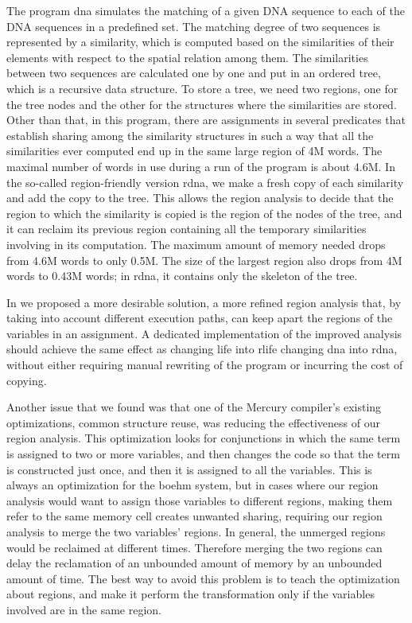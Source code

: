 \documentclass{tlp}
\newcommand{\bench}[1]{{#1}}
\begin{document}
The program \bench{dna} simulates the matching of a given DNA sequence
to each of the DNA sequences in a predefined set.
The matching degree of two sequences is represented by a similarity,
which is computed based on the similarities of their elements
with respect to the spatial relation among them.
The similarities between two sequences are calculated one by one
and put in an ordered tree, which is a recursive data structure.
To store a tree, we need two regions, one for the tree nodes
and the other for the structures where the similarities are stored.
Other than that, in this program,
there are assignments in several predicates
that establish sharing among the similarity structures in such a way that
all the similarities ever computed end up in the same large region of 4M words.
The maximal number of words in use during a run of the program is about 4.6M.
In the so-called region-friendly version \bench{rdna},
we make a fresh copy of each similarity and add the copy to the tree.
This allows the region analysis to decide
that the region to which the similarity is copied
is the region of the nodes of the tree,
and it can reclaim its previous region containing
all the temporary similarities involving in its computation.
The maximum amount of memory needed drops from 4.6M words to only 0.5M.
The size of the largest region also drops from 4M words to 0.43M words;
in \bench{rdna}, it contains only the skeleton of the tree.

In \cite{Phan09ppdp} we proposed a more desirable solution,
a more refined region analysis that,
by taking into account different execution paths,
can keep apart the regions of the variables in an assignment.
A dedicated implementation of the improved analysis
should achieve the same effect as
changing \bench{life} into \bench{rlife}
changing \bench{dna} into \bench{rdna},
without either requiring manual rewriting of the program
or incurring the cost of copying.

Another issue that we found was that
one of the Mercury compiler's existing optimizations, common structure reuse,
was reducing the effectiveness of our region analysis.
This optimization looks for conjunctions
in which the same term is assigned to two or more variables,
and then changes the code so that the term is constructed just once,
and then it is assigned to all the variables.
This is always an optimization for the boehm system,
but in cases where our region analysis
would want to assign those variables to different regions,
making them refer to the same memory cell creates unwanted sharing,
requiring our region analysis to merge the two variables' regions.
In general, the unmerged regions would be reclaimed at different times.
Therefore merging the two regions can delay
the reclamation of an unbounded amount of memory
by an unbounded amount of time.
The best way to avoid this problem
is to teach the optimization about regions,
and make it perform the transformation
only if the variables involved are in the same region.
\end{document}
